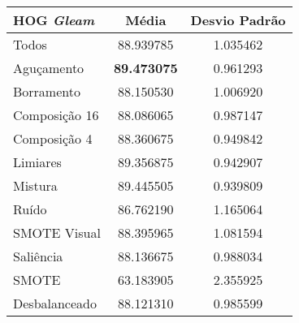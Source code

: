 

\begin{table}[!htbp]
\centering
\caption{}
\label{tab:resultados:x:melhor}
\begin{tabular}{|l|c|c|}
\hline
\textbf{HOG \emph{Gleam}} & \textbf{Média}     & \textbf{Desvio Padrão} \\ \hline
   Todos        &  88.939785 &  1.035462  \\ \hline
  Aguçamento    &  \textbf{89.473075} &  0.961293  \\ \hline
  Borramento    &  88.150530 &  1.006920  \\ \hline
  Composição 16 &  88.086065 &  0.987147  \\ \hline
  Composição 4  &  88.360675 &  0.949842  \\ \hline
  Limiares      &  89.356875 &  0.942907  \\ \hline
  Mistura       &  89.445505 &  0.939809  \\ \hline
  Ruído         &  86.762190 &  1.165064  \\ \hline
  SMOTE Visual  &  88.395965 &  1.081594  \\ \hline
  Saliência     &  88.136675 &  0.988034  \\ \hline
 SMOTE          &  63.183905 &  2.355925  \\ \hline
Desbalanceado   &  88.121310 &  0.985599  \\ \hline
\end{tabular}
\end{table}

